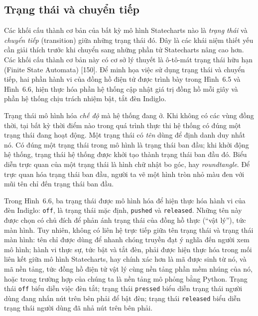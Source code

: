 \subsection{Trạng thái và chuyển tiếp}
Các khối cấu thành cơ bản của bất kỳ mô hình Statecharts nào là \emph{trạng thái} và \emph{chuyển tiếp} (transition) giữa những trạng thái đó. Đây là các khái niệm thiết yếu cần giải thích trước khi chuyển sang những phần tử Statecharts nâng cao hơn. Các khối cấu thành cơ bản này có cơ sở lý thuyết là ô-tô-mát trạng thái hữu hạn (Finite State Automata) [150]. Để minh họa việc sử dụng trạng thái và chuyển tiếp, hai phần hành vi của đồng hồ điện tử được trình bày trong Hình~6.5 và Hình~6.6, hiện thực hóa phần hệ thống cập nhật giá trị đồng hồ mỗi giây và phần hệ thống chịu trách nhiệm bật, tắt đèn Indiglo.


Trạng thái mô hình hóa \emph{chế độ} mà hệ thống đang ở. Khi không có các vùng đồng thời, tại bất kỳ thời điểm nào trong quá trình thực thi hệ thống có đúng một trạng thái đang hoạt động. Một trạng thái có \emph{tên} dùng để định danh duy nhất nó. Có đúng một trạng thái trong mô hình là trạng thái ban đầu; khi khởi động hệ thống, trạng thái hệ thống được khởi tạo thành trạng thái ban đầu đó. Biểu diễn trực quan của một trạng thái là hình chữ nhật bo góc, hay \emph{roundtangle}. Để trực quan hóa trạng thái ban đầu, người ta vẽ một hình tròn nhỏ màu đen với mũi tên chỉ đến trạng thái ban đầu.

Trong Hình~6.6, ba trạng thái được mô hình hóa để hiện thực hóa hành vi của đèn Indiglo: \texttt{off}, là trạng thái mặc định, \texttt{pushed} và \texttt{released}. Những tên này được chọn có chủ đích để phản ánh trạng thái của đồng hồ thực (``vật lý''), tức màn hình. Tuy nhiên, không có liên hệ trực tiếp giữa tên trạng thái và trạng thái màn hình: tên chỉ được dùng để nhanh chóng truyền đạt ý nghĩa đến người xem mô hình; hành vi thực sự, tức bật và tắt đèn, phải được hiện thực hóa trong mối liên kết giữa mô hình Statecharts, hay chính xác hơn là mã được sinh từ nó, và mã nền tảng, tức đồng hồ điện tử vật lý cùng nền tảng phần mềm nhúng của nó, hoặc trong trường hợp của chúng ta là nền tảng mô phỏng bằng Python. Trạng thái \texttt{off} biểu diễn việc đèn tắt; trạng thái \texttt{pressed} biểu diễn trạng thái người dùng đang nhấn nút trên bên phải để bật đèn; trạng thái \texttt{released} biểu diễn trạng thái người dùng đã nhả nút trên bên phải.

